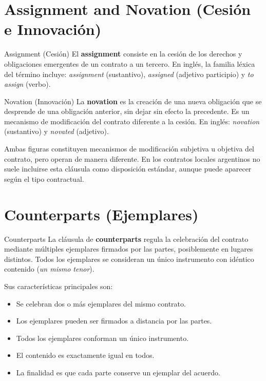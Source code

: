 \documentclass[12pt,oneside]{book}
\begin{document}
\section{Assignment and Novation (Cesión e Innovación)}

\begin{definition}{Assignment (Cesión)}
El \textbf{assignment} consiste en la cesión de los derechos y
obligaciones emergentes de un contrato a un tercero. En inglés, la
familia léxica del término incluye: \textit{assignment} (sustantivo),
\textit{assigned} (adjetivo participio) y \textit{to assign} (verbo).
\end{definition}

\begin{definition}{Novation (Innovación)}
La \textbf{novation} es la creación de una nueva obligación que se
desprende de una obligación anterior, sin dejar sin efecto la precedente.
Es un mecanismo de modificación del contrato diferente a la cesión. En
inglés: \textit{novation} (sustantivo) y \textit{novated} (adjetivo).
\end{definition}

Ambas figuras constituyen mecanismos de modificación subjetiva u objetiva
del contrato, pero operan de manera diferente. En los contratos locales
argentinos no suele incluirse esta cláusula como disposición estándar,
aunque puede aparecer según el tipo contractual.

\section{Counterparts (Ejemplares)}

\begin{definition}{Counterparts}
La cláusula de \textbf{counterparts} regula la celebración del contrato
mediante múltiples ejemplares firmados por las partes, posiblemente en
lugares distintos. Todos los ejemplares se consideran un único instrumento
con idéntico contenido (\emph{un mismo tenor}).
\end{definition}

Sus características principales son:
\begin{itemize}
    \item Se celebran dos o más ejemplares del mismo contrato.
    \item Los ejemplares pueden ser firmados a distancia por las partes.
    \item Todos los ejemplares conforman un único instrumento.
    \item El contenido es exactamente igual en todos.
    \item La finalidad es que cada parte conserve un ejemplar del acuerdo.
\end{itemize}
\end{document}
